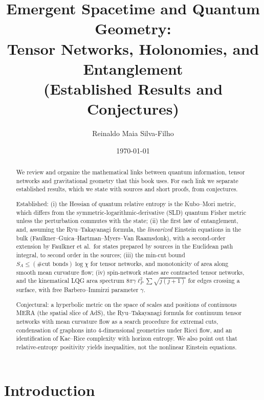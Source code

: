 \documentclass[11pt,a4paper,reqno]{amsart}
\title[Emergent Spacetime and Quantum Geometry]{Emergent Spacetime and Quantum Geometry:\\ Tensor Networks, Holonomies, and Entanglement\\ (Established Results and Conjectures)}
\author{Reinaldo Maia Silva-Filho}
\date{\today}
\theoremstyle{definition}
\numberwithin{equation}{section}
\begin{document}
\begin{abstract}
We review and organize the mathematical links between quantum information, tensor networks and gravitational geometry that this book uses. For each link we separate established results, which we state with sources and short proofs, from conjectures.

Established: (i) the Hessian of quantum relative entropy is the Kubo--Mori metric, which differs from the symmetric-logarithmic-derivative (SLD) quantum Fisher metric unless the perturbation commutes with the state; (ii) the first law of entanglement, and, assuming the Ryu--Takayanagi formula, the \emph{linearized} Einstein equations in the bulk (Faulkner--Guica--Hartman--Myers--Van Raamsdonk), with a second-order extension by Faulkner et al.\ for states prepared by sources in the Euclidean path integral, to second order in the sources; (iii) the min-cut bound $S_A \le (\#\text{cut bonds})\log\chi$ for tensor networks, and monotonicity of area along smooth mean curvature flow; (iv) spin-network states are contracted tensor networks, and the kinematical LQG area spectrum $8\pi\gamma\ell_P^2\sum\sqrt{j(j+1)}$ for edges crossing a surface, with free Barbero--Immirzi parameter $\gamma$.

Conjectural: a hyperbolic metric on the space of scales and positions of continuous MERA (the spatial slice of AdS), the Ryu--Takayanagi formula for continuum tensor networks with mean curvature flow as a search procedure for extremal cuts, condensation of graphons into $4$-dimensional geometries under Ricci flow, and an identification of Kac--Rice complexity with horizon entropy. We also point out that relative-entropy positivity yields inequalities, not the nonlinear Einstein equations.
\end{abstract}

\maketitle

\tableofcontents
\newpage

\section{Introduction}
\label{sec:intro}
\end{document}
